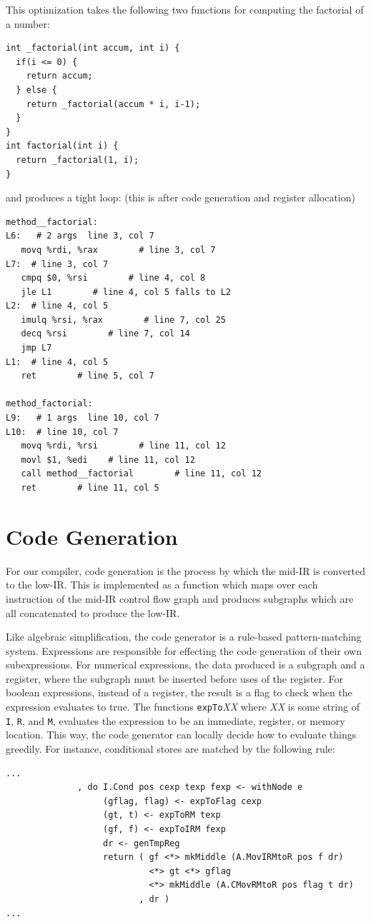 \documentclass[11pt]{article}
\begin{document}
This optimization takes the following two functions for computing the
factorial of a number:
{\footnotesize
\begin{verbatim}
int _factorial(int accum, int i) {
  if(i <= 0) {
    return accum;
  } else {
    return _factorial(accum * i, i-1);
  }
}
int factorial(int i) {
  return _factorial(1, i);
}
\end{verbatim}}
and produces a tight loop: (this is after code generation and
register allocation)
{\footnotesize
\begin{verbatim}
method__factorial:
L6:   # 2 args  line 3, col 7
   movq %rdi, %rax        # line 3, col 7
L7:  # line 3, col 7
   cmpq $0, %rsi        # line 4, col 8
   jle L1        # line 4, col 5 falls to L2
L2:  # line 4, col 5
   imulq %rsi, %rax        # line 7, col 25
   decq %rsi        # line 7, col 14
   jmp L7
L1:  # line 4, col 5
   ret        # line 5, col 7

method_factorial:
L9:   # 1 args  line 10, col 7
L10:  # line 10, col 7
   movq %rdi, %rsi        # line 11, col 12
   movl $1, %edi    # line 11, col 12
   call method__factorial        # line 11, col 12
   ret        # line 11, col 5
\end{verbatim}
}

\section{Code Generation}

For our compiler, code generation is the process by which the mid-IR
is converted to the low-IR.  This is implemented as a function which
maps over each instruction of the mid-IR control flow graph and
produces subgraphs which are all concatenated to produce the low-IR.

Like algebraic simplification, the code generator is a rule-based
pattern-matching system.  Expressions are responsible for effecting
the code generation of their own subexpressions.  For numerical
expressions, the data produced is a subgraph and a register, where the
subgraph must be inserted before uses of the register.  For boolean
expressions, instead of a register, the result is a flag to check when
the expression evaluates to true.  The functions
\texttt{expTo}\textit{XX} where \textit{XX} is some string of
\texttt{I}, \texttt{R}, and \texttt{M}, evaluates the expression to be
an immediate, register, or memory location.  This way, the code
generator can locally decide how to evaluate things greedily.  For
instance, conditional stores are matched by the following rule:
{\footnotesize
\begin{verbatim}
...
              , do I.Cond pos cexp texp fexp <- withNode e
                   (gflag, flag) <- expToFlag cexp
                   (gt, t) <- expToRM texp
                   (gf, f) <- expToIRM fexp
                   dr <- genTmpReg
                   return ( gf <*> mkMiddle (A.MovIRMtoR pos f dr)
                            <*> gt <*> gflag
                            <*> mkMiddle (A.CMovRMtoR pos flag t dr)
                          , dr )
...
\end{verbatim}
}
\end{document}
